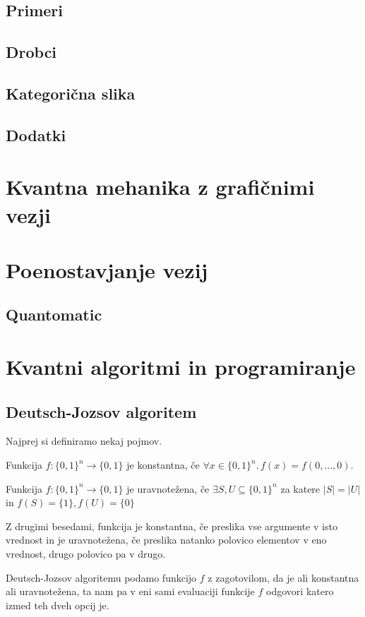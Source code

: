 \documentclass[mat1]{fmfdelo}
\newcommand{\sep}{\ensuremath{.\,}}
\begin{document}
\subsection{Primeri}
\subsection{Drobci}
\subsection{Kategorična slika}
\subsection{Dodatki}
\section{Kvantna mehanika z grafičnimi vezji}
\section{Poenostavjanje vezij}
\subsection{Quantomatic}
\section{Kvantni algoritmi in programiranje}
\subsection{Deutsch-Jozsov algoritem}
Najprej si definiramo nekaj pojmov.
\begin{definicija} Funkcija \(f:\{0,1\}^n\to \{0,1\}\) je konstantna, če \(\forall x\in\{0,1\}^n\sep f(x) = f(0,\ldots, 0)\).\end{definicija}
\begin{definicija}
    Funkcija \(f: \{0,1\}^n \to \{0,1\}\) je uravnotežena, če \(\exists S, U\subseteq \{0,1\}^n\) za katere \(\lvert S\rvert = \lvert U\rvert\) in \(f(S) = \{1\}, f(U) = \{0\}\)
\end{definicija}
Z drugimi besedami, funkcija je konstantna, če preslika vse argumente v isto vrednost in je uravnotežena, če preslika natanko polovico elementov v eno vrednost, drugo polovico pa v drugo.

Deutsch-Jozsov algoritemu podamo funkcijo \(f\) z zagotovilom, da je ali konstantna ali uravnotežena, ta nam pa v eni sami evaluaciji funkcije \(f\) odgovori katero izmed teh dveh opcij je.
\end{document}
